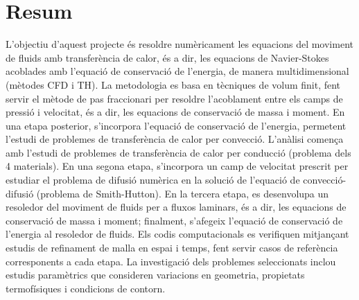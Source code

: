 \section*{Resum}
L'objectiu d'aquest projecte és resoldre numèricament les equacions del moviment de fluids amb transferència de calor, és a dir, les equacions de Navier-Stokes acoblades amb l'equació de conservació de l'energia, de manera multidimensional (mètodes CFD i TH). La metodologia es basa en tècniques de volum finit, fent servir el mètode de pas fraccionari per resoldre l'acoblament entre els camps de pressió i velocitat, és a dir, les equacions de conservació de massa i moment. En una etapa posterior, s'incorpora l'equació de conservació de l'energia, permetent l'estudi de problemes de transferència de calor per convecció. L'anàlisi comença amb l'estudi de problemes de transferència de calor per conducció (problema dels 4 materials). En una segona etapa, s'incorpora un camp de velocitat prescrit per estudiar el problema de difusió numèrica en la solució de l'equació de convecció-difusió (problema de Smith-Hutton). En la tercera etapa, es desenvolupa un resoledor del moviment de fluids per a fluxos laminars, és a dir, les equacions de conservació de massa i moment; finalment, s'afegeix l'equació de conservació de l'energia al resoledor de fluids. Els codis computacionals es verifiquen mitjançant estudis de refinament de malla en espai i temps, fent servir casos de referència corresponents a cada etapa. La investigació dels problemes seleccionats inclou estudis paramètrics que consideren variacions en geometria, propietats termofísiques i condicions de contorn.

